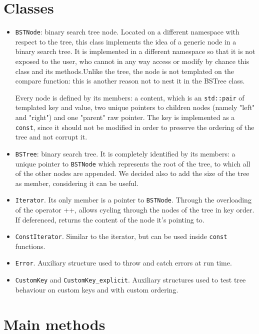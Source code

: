 \documentclass[12pt,a4paper,openany]{scrartcl}
\begin{document}
	\section{Classes}
	\begin{itemize}
		\item\texttt{BSTNode}: binary search tree node. Located on a different namespace with respect to the tree, this class implements the idea of a generic node in a binary search tree. It is implemented in a different namespace so that it is not exposed to the user, who cannot in any way access or modify by chance this class and its methods.Unlike the tree, the node is not templated on the compare function: this is another reason not to nest it in the BSTree class.
		
		Every node is defined by its members: a content, which is an \texttt{std::pair} of templated key and value, two unique pointers to children nodes (namely "left" and "right") and one "parent" raw pointer. The key is implemented as a \texttt{const}, since it should not be modified in order to preserve the ordering of the tree and not corrupt it.
		
		\item \texttt{BSTree}: binary search tree. It is completely identified by its members: a unique pointer to \texttt{BSTNode} which represents the root of the tree, to which all of the other nodes are appended. We decided also to add the size of the tree as member, considering it can be useful.
		
		\item \texttt{Iterator}. Its only member is a pointer to \texttt{BSTNode}. Through the overloading of the operator ++, allows cycling through the nodes of the tree in key order. If deferenced, returns the content of the node it's pointing to.
		
		\item \texttt{ConstIterator}. Similar to the iterator, but can be used inside \texttt{const} functions.
		
		\item \texttt{Error}. Auxiliary structure used to throw and catch errors at run time.
		
		\item \texttt{CustomKey} and \texttt{CustomKey\_explicit}. Auxiliary structures used to test tree behaviour on custom keys and with custom ordering.
	\end{itemize}
	
	
	\section{Main methods}
	
\end{document}
